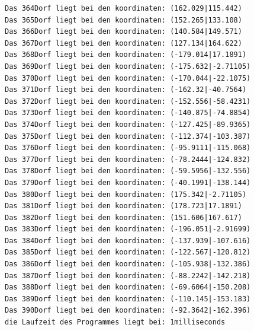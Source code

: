 \documentclass{article}
\begin{document}
\begin{verbatim}
Das 364Dorf liegt bei den koordinaten: (162.029|115.442)
Das 365Dorf liegt bei den koordinaten: (152.265|133.108)
Das 366Dorf liegt bei den koordinaten: (140.584|149.571)
Das 367Dorf liegt bei den koordinaten: (127.134|164.622)
Das 368Dorf liegt bei den koordinaten: (-179.014|17.1891)
Das 369Dorf liegt bei den koordinaten: (-175.632|-2.71105)
Das 370Dorf liegt bei den koordinaten: (-170.044|-22.1075)
Das 371Dorf liegt bei den koordinaten: (-162.32|-40.7564)
Das 372Dorf liegt bei den koordinaten: (-152.556|-58.4231)
Das 373Dorf liegt bei den koordinaten: (-140.875|-74.8854)
Das 374Dorf liegt bei den koordinaten: (-127.425|-89.9365)
Das 375Dorf liegt bei den koordinaten: (-112.374|-103.387)
Das 376Dorf liegt bei den koordinaten: (-95.9111|-115.068)
Das 377Dorf liegt bei den koordinaten: (-78.2444|-124.832)
Das 378Dorf liegt bei den koordinaten: (-59.5956|-132.556)
Das 379Dorf liegt bei den koordinaten: (-40.1991|-138.144)
Das 380Dorf liegt bei den koordinaten: (175.342|-2.71105)
Das 381Dorf liegt bei den koordinaten: (178.723|17.1891)
Das 382Dorf liegt bei den koordinaten: (151.606|167.617)
Das 383Dorf liegt bei den koordinaten: (-196.051|-2.91699)
Das 384Dorf liegt bei den koordinaten: (-137.939|-107.616)
Das 385Dorf liegt bei den koordinaten: (-122.567|-120.812)
Das 386Dorf liegt bei den koordinaten: (-105.938|-132.386)
Das 387Dorf liegt bei den koordinaten: (-88.2242|-142.218)
Das 388Dorf liegt bei den koordinaten: (-69.6064|-150.208)
Das 389Dorf liegt bei den koordinaten: (-110.145|-153.183)
Das 390Dorf liegt bei den koordinaten: (-92.3642|-162.396)
die Laufzeit des Programmes liegt bei: 1milliseconds

\end{verbatim}
\end{document}
